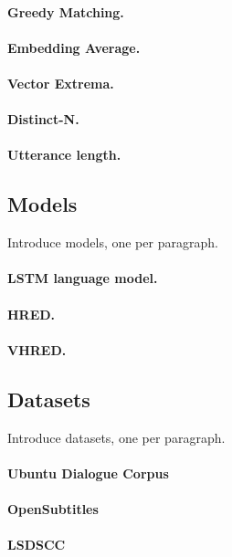 \documentclass[runningheads]{llncs}
\begin{document}
\paragraph{Greedy Matching.}
\paragraph{Embedding Average.}
\paragraph{Vector Extrema.}

\paragraph{Distinct-N.}
\paragraph{Utterance length.}

\subsection{Models}
Introduce models, one per paragraph.
\paragraph{LSTM language model.}
\paragraph{HRED.}
\paragraph{VHRED.}

\subsection{Datasets}
Introduce datasets, one per paragraph.
\paragraph{Ubuntu Dialogue Corpus}
\paragraph{OpenSubtitles}
\paragraph{LSDSCC}
\end{document}
